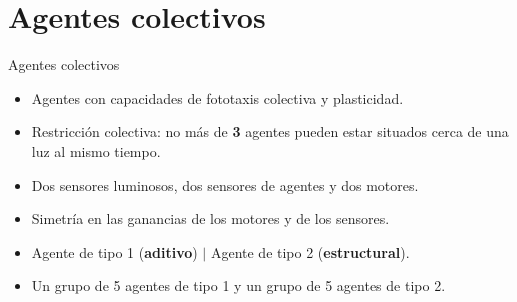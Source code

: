 \documentclass[aspectratio=169]{beamer}
\begin{document}
\section{Agentes colectivos}
\begin{frame}{Agentes colectivos}
  \begin{itemize}
    \item Agentes con capacidades de fototaxis colectiva y plasticidad.
    \item Restricción colectiva: no más de \textbf{3} agentes pueden estar situados cerca de una luz al mismo tiempo.
    \item Dos sensores luminosos, dos sensores de agentes y dos motores.
    \item Simetría en las ganancias de los motores y de los sensores.
    \item Agente de tipo 1 (\textbf{aditivo}) $|$ Agente de tipo 2 (\textbf{estructural}).
    \item Un grupo de 5 agentes de tipo 1 y un grupo de 5 agentes de tipo 2.
  \end{itemize}
\end{frame}
\end{document}
